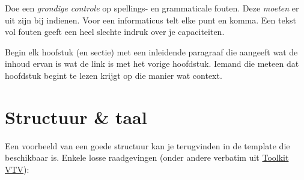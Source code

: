Doe een \emph{grondige controle} op spellings- en grammaticale fouten. Deze \emph{moeten} er uit zijn bij indienen. Voor een informaticus telt elke punt en komma. Een tekst vol fouten geeft een heel slechte indruk over je capaciteiten.

Begin elk hoofstuk (en sectie) met een inleidende paragraaf die aangeeft wat de inhoud ervan is wat de link is met het vorige hoofdstuk. Iemand die meteen dat hoofdstuk begint te lezen krijgt op die manier wat context.




%

\section{Structuur \& taal}
\label{sec:structuur}
Een voorbeeld van een goede structuur kan je terugvinden in de template die beschikbaar is. Enkele losse raadgevingen (onder andere verbatim uit \href{http://www.toolkitvtv.nl/organisatie-en-proces/redactierichtlijnen/heldere-taal-gebruiken/index.html#Objectiefformuleren}{Toolkit VTV}):

